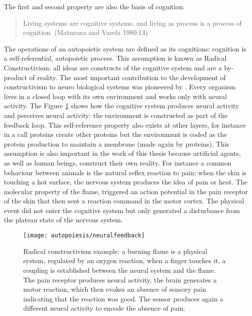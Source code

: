 The first and second property are also the basis of cognition:
\begin{quote}
Living systems are cognitive systems, and living as process is a process of cognition.
(Maturana and Varela 1980:13)
\end{quote}
The operations of an autopoietic system are defined as its cognitions: cognition is
a self-referential, autopoietic process.
This assumption is known as Radical Constructivism:
all ideas are constructs of the cognitive system and are a by-product of reality.
The most important contribution to the development of constructivism to neuro biological
 systems was pioneered by \citet{VanFoerster2003:Cybernetics}.
Every organism lives in a closed loop with its own environment and works only with neural activity.
The Figure \ref{Fig:Autopoiesis:Radical} shows how the cognitive system produces neural activity and
perceives neural activity: the environment is constructed as part of the feedback loop.
This self-reference property also exists at other layers, for instance in a call 
proteins create other proteins but the environment is coded as the protein production 
to maintain a membrane (made again by proteins).
This assumption is also important in the work of this thesis because artificial
agents, as well as human beings, construct their own reality. For instance a common behaviour
between animals is the natural reflex reaction to pain: when the skin is touching a
hot surface, the nervous system produces the idea of pain or heat.
The molecular property of the flame, triggered an action potential in the pain
receptor of the skin that then sent a reaction command in the motor cortex.
The physical event did not enter the cognitive system but only generated
a disturbance from the plateau state of the nervous system.

\begin{figure}[htbp]
\begin{center}
\texttt{[image: autopoiesis/neuralfeedback]}
\end{center}
\small{
\caption[Radical constructivism example]{Radical constructivism example:
a burning flame is a physical system,
regulated by an oxygen reaction, when a finger touches it, a coupling is established
between the neural system and the flame.
The pain receptor produces neural activity, the brain generates a motor reaction, which then
 evokes an absence of sensory pain indicating that the reaction was good. 
The sensor produces again a different neural activity to encode the absence of pain.
\label{Fig:Autopoiesis:Radical}}}
\end{figure}

